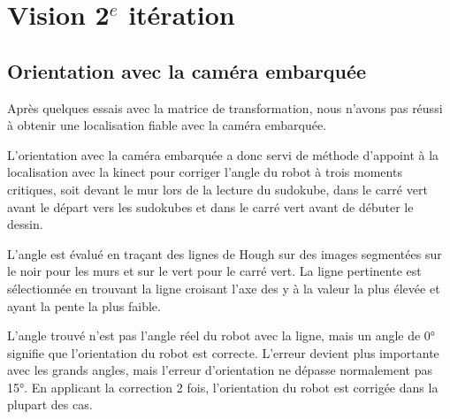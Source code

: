 


\chapter{Vision 2$^{e}$ itération}
\label{s:vision2}

\section{Orientation avec la caméra embarquée}

Après quelques essais avec la matrice de transformation, nous n'avons pas réussi à obtenir une localisation fiable avec la caméra embarquée. 

L'orientation avec la caméra embarquée a donc servi de méthode d'appoint à la localisation avec la kinect pour corriger l'angle du robot à trois moments critiques, soit devant le mur lors de la lecture du sudokube, dans le carré vert avant le départ vers les sudokubes et dans le carré vert avant de débuter le dessin. 

L'angle est évalué en traçant des lignes de Hough sur des images segmentées sur le noir pour les murs et sur le vert pour le carré vert. La ligne pertinente est sélectionnée en trouvant la ligne croisant l'axe des y à la valeur la plus élevée et ayant la pente la plus faible. 

L'angle trouvé n'est pas l'angle réel du robot avec la ligne, mais un angle de 0° signifie que l'orientation du robot est correcte. L'erreur devient plus importante avec les grands angles, mais l'erreur d'orientation ne dépasse normalement pas 15°. En applicant la correction 2 fois, l'orientation du robot est corrigée dans la plupart des cas.